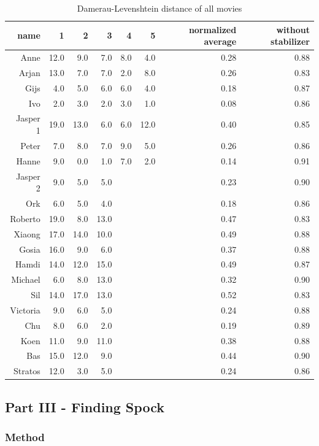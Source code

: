 \begin{table}
\centering
\begin{tabular}{rrrrrrrr}
\hline
name	& 1 & 2 & 3 & 4 & 5 & normalized average & without stabilizer\\
\hline
Anne		&	12.0	&	9.0		&	7.0		&	8.0	&	4.0	&	0.28 & 0.88 \\
Arjan		&	13.0	&	7.0		&	7.0		&	2.0	&	8.0	&	0.26 & 0.83 \\
Gijs		&	4.0		&	5.0		&	6.0		&	6.0	&	4.0	&	0.18 & 0.87 \\
Ivo			&	2.0		&	3.0		&	2.0		&	3.0	&	1.0	&	0.08 & 0.86 \\
Jasper 1	&	19.0	&	13.0	&	6.0		&	6.0	&	12.0 &	0.40 & 0.85 \\
Peter		&	7.0		&	8.0		&	7.0		&	9.0	&	5.0	&	0.26 & 0.86 \\
Hanne		&	9.0		&	0.0		&	1.0		&	7.0	&	2.0	&	0.14 & 0.91 \\
Jasper 2	&	9.0		&	5.0		&	5.0 	& & & 0.23 & 0.90 \\
Ork			&	6.0		&	5.0		&	4.0		& & & 0.18 & 0.86 \\
Roberto		&	19.0	&	8.0		&	13.0	& & & 0.47 & 0.83 \\
Xiaong		&	17.0	&	14.0	&	10.0	& & & 0.49 & 0.88 \\
\hline
Gosia		&	16.0	&	9.0		&	6.0		& & & 0.37 & 0.88 \\
Hamdi		&	14.0	&	12.0	&	15.0	& & & 0.49 & 0.87 \\
Michael		&	6.0		&	8.0		&	13.0	& & & 0.32 & 0.90 \\
Sil			&	14.0	&	17.0	&	13.0	& & & 0.52 & 0.83 \\
Victoria	&	9.0		&	6.0		&	5.0		& & & 0.24 & 0.88 \\
Chu			&	8.0		&	6.0		&	2.0 	& & & 0.19 & 0.89 \\
\hline
Koen		&	11.0	&	9.0		&	11.0 	& & & 0.38 & 0.88\\
Bas			&	15.0	&	12.0	&	9.0		& & & 0.44 & 0.90 \\
Stratos		&	12.0	&	3.0		&	5.0		& & & 0.24 & 0.86 \\

\hline
\end{tabular}
\caption{Damerau-Levenshtein distance of all movies}
\end{table}

\subsection{Part III - Finding Spock}

\subsubsection{Method}
